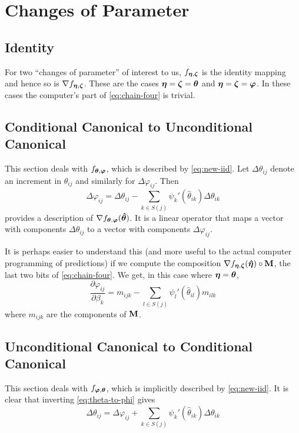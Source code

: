 \section{Changes of Parameter}

\subsection{Identity}

For two ``changes of parameter'' of interest to us,
$f_{{\boldsymbol{\eta}}, {\boldsymbol{\zeta}}}$ is the identity mapping and hence so is
$\nabla f_{{\boldsymbol{\eta}}, {\boldsymbol{\zeta}}}$.
These are the cases ${\boldsymbol{\eta}} = {\boldsymbol{\zeta}} = {\boldsymbol{\theta}}$
and ${\boldsymbol{\eta}} = {\boldsymbol{\zeta}} = {\boldsymbol{\varphi}}$.
In these cases the computer's part of \eqref{eq:chain-four} is trivial.

\subsection{Conditional Canonical to Unconditional Canonical}

This section deals with $f_{{\boldsymbol{\theta}}, {\boldsymbol{\varphi}}}$, which is described
by \eqref{eq:new-iid}.
Let $\Delta \theta_{i j}$ denote an increment in $\theta_{i j}$
and similarly for $\Delta \varphi_{i j}$.  Then
\begin{equation} \label{eq:theta-to-phi}
   \Delta \varphi_{i j}
   =
   \Delta \theta_{i j}
   -
   \sum_{k \in S(j)} \psi_k'(\hat{\theta}_{i k}) \Delta \theta_{i k}
\end{equation}
provides a description of $\nabla f_{{\boldsymbol{\theta}}, {\boldsymbol{\varphi}}}({\boldsymbol{\hat{\theta}}})$.
It is a linear operator that
maps a vector with components $\Delta \theta_{i j}$
to a vector with components $\Delta \varphi_{i j}$.

It is perhaps easier to understand this (and more useful to the actual
computer programming of predictions) if we compute the composition
$\nabla f_{{\boldsymbol{\eta}}, {\boldsymbol{\zeta}}}({\boldsymbol{\hat{\eta}}}) \circ \mathbf{M}$, the last
two bits of \eqref{eq:chain-four}.  We get, in this case where
${\boldsymbol{\eta}} = {\boldsymbol{\theta}}$,
$$
   \frac{\partial \varphi_{i j}}{\partial \beta_k}
   =
   m_{i j k}
   -
   \sum_{l \in S(j)} \psi_l'(\hat{\theta}_{i l}) m_{i l k}
$$
where $m_{i j k}$ are the components of $\mathbf{M}$.

\subsection{Unconditional Canonical to Conditional Canonical}

This section deals with $f_{{\boldsymbol{\varphi}}, {\boldsymbol{\theta}}}$, which is implicitly
described by \eqref{eq:new-iid}.
It is clear that inverting \eqref{eq:theta-to-phi} gives
\begin{equation} \label{eq:phi-to-theta}
   \Delta \theta_{i j}
   =
   \Delta \varphi_{i j}
   +
   \sum_{k \in S(j)} \psi_k'(\hat{\theta}_{i k}) \Delta \theta_{i k}
\end{equation}

